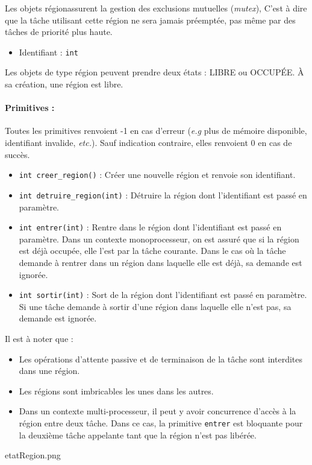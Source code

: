 {
Les objets \og région\fg assurent la gestion des exclusions mutuelles (\textsl{mutex}), C'est à dire que la tâche utilisant cette région ne sera jamais préemptée, pas même par des tâches de priorité plus haute.
}
{
\begin{itemize}
	\item Identifiant : \texttt{int}
\end{itemize}
}
{
Les objets de type région peuvent prendre deux états : LIBRE ou OCCUPÉE. À sa création, une région est libre.

\paragraph{Primitives :}
Toutes les primitives renvoient -1 en cas d'erreur (\textsl{e.g} plus de mémoire disponible, identifiant invalide, \textsl{etc.}). Sauf indication contraire, elles renvoient 0 en cas de succès.

\begin{itemize}
	\item \texttt{int creer\_region()} : Créer une nouvelle région et renvoie son identifiant.
	\item \texttt{int detruire\_region(int)} : Détruire la région dont l'identifiant est passé en paramètre. 
	\item \texttt{int entrer(int)} : Rentre dans le région dont l'identifiant est passé en paramètre. Dans un contexte monoprocesseur, on est assuré que si la région est déjà occupée, elle l'est par la tâche courante. Dans le cas où la tâche demande à rentrer dans un région dans laquelle elle est déjà, sa demande est ignorée.
	\item \texttt{int sortir(int)} : Sort de la région dont l'identifiant est passé en paramètre. Si une tâche demande à sortir d'une région dans laquelle elle n'est pas, sa demande est ignorée.
\end{itemize}
}
{
Il est à noter que :
\begin{itemize}
	\item Les opérations d'attente passive et de terminaison de la tâche sont interdites dans une région.
	\item Les régions sont imbricables les unes dans les autres.
	\item Dans un contexte multi-processeur, il peut y avoir concurrence d'accès à la région entre deux tâche. Dans ce cas, la primitive \texttt{entrer} est bloquante pour la deuxième tâche appelante tant que la région n'est pas libérée.
\end{itemize}
}
{etatRegion.png}
